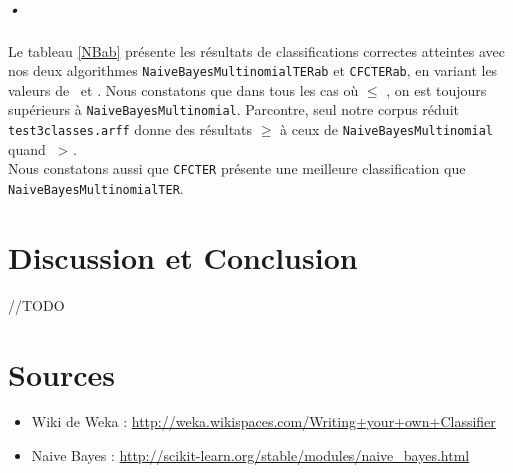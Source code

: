 \documentclass{article}
\begin{document}
\subparagraph*{•}
Le tableau \ref{NBab} présente les résultats de classifications correctes atteintes avec nos deux algorithmes \texttt{NaiveBayesMultinomialTERab} et \texttt{CFCTERab}, en variant les valeurs de \textalpha  \ et \textbeta . Nous constatons que dans tous les cas où \textalpha $ \leq$ \textbeta , on est toujours supérieurs à  \texttt{NaiveBayesMultinomial}.   Parcontre, seul notre corpus réduit \texttt{test3classes.arff} donne des résultats $\geq$ à ceux de \texttt{NaiveBayesMultinomial} quand \textalpha \ > \textbeta .\\
Nous constatons aussi que \texttt{CFCTER\textalpha\textbeta} présente une meilleure classification que \texttt{NaiveBayesMultinomialTER\textalpha\textbeta}.


\section{Discussion et Conclusion }
//TODO

\newpage
\section{Sources}
\begin{itemize}
\item Wiki de Weka : \href{http://weka.wikispaces.com/Writing+your+own+Classifier}{http://weka.wikispaces.com/Writing+your+own+Classifier}
 \\
\item Naive Bayes  : \href{$http://scikit-learn.org/stable/modules/naive_bayes.html$}{http://scikit-learn.org/stable/modules/naive\_bayes.html}


\end{itemize}



\end{document}
